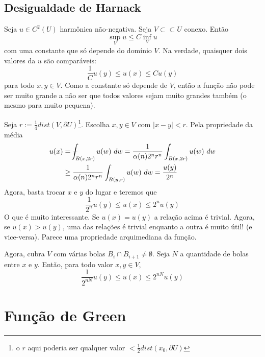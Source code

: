 \documentclass[11pt]{article}
\newcommand{\p}{\partial}
\def\Xint#1{\mathchoice
	{\XXint\displaystyle\textstyle{#1}}%
	{\XXint\textstyle\scriptstyle{#1}}%
	{\XXint\scriptstyle\scriptscriptstyle{#1}}%
	{\XXint\scriptscriptstyle\scriptscriptstyle{#1}}%
	\!\int}
\def\XXint#1#2#3{{\setbox0=\hbox{$#1{#2#3}{\int}$ }
		\vcenter{\hbox{$#2#3$ }}\kern-.6\wd0}}
\def\dashint{\Xint-}
\begin{document}
\subsection{Desigualdade de Harnack}
Seja \( u \in C^2(U) \) harmônica não-negativa. Seja \( V \subset\subset U \) conexo. Então \[ \sup_{V} u \leq C \inf_{V} u \] com uma constante que só depende do domínio \( V \). Na verdade, quaisquer dois valores da \( u \) são comparáveis: \[\frac{1}{C} u(y) \leq u(x) \leq C u(y)  \] para todo \( x,y \in V \). Como a constante só depende de \( V \), então a função não pode ser muito grande a não ser que todos valores sejam muito grandes também (o mesmo para muito pequena).

Seja \( r := \frac{1}{4}dist(V, \p U) \)\footnote{o \( r \) aqui poderia ser qualquer valor \( < \frac{1}{2}dist(x_0, \p U) \) }. Escolha \( x,y \in V\) com \(|x-y| < r \). Pela propriedade da média \begin{align*}
	u(x) &= \dashint_{B(x,2r)} u(w)\ dw = \frac{1}{\alpha (n) 2^n r^n} \int_{B(x, 2r)} u(w)\ dw \\
	&\geq \frac{1}{\alpha (n) 2^n r^n} \int_{B(y, r)} u(w)\ dw  = \frac{u(y)}{2^n}
\end{align*} Agora, basta trocar \( x \) e \( y \) do lugar e teremos que \[  \frac{1}{2^n} u(y) \leq u(x) \leq 2^n u(y)  \] O que é muito interessante. Se \( u(x) = u(y) \) a relação acima é trivial. Agora, se \( u(x) > u(y) \), uma das relações é trivial enquanto a outra é muito útil! (e vice-versa). Parece uma propriedade arquimediana da função.

Agora, cubra \(  V \) com várias bolas \( B_i \cap B_{i+1} \neq \emptyset \).
Seja \( N \) a quantidade de bolas entre \( x \) e \(  y \). Então, para todo valor \( x, y \in V \), \[  \frac{1}{2^{nN} } u(y) \leq u(x) \leq 2^{nN} u(y)  \] 





























\section{Função de Green}
\end{document}
